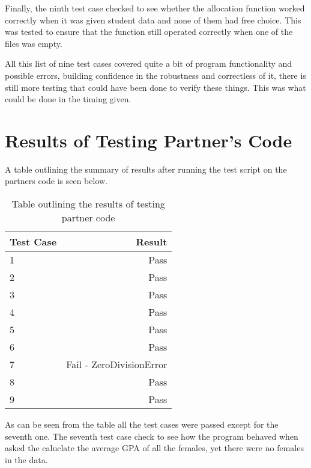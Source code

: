 \documentclass[12pt]{article}
\begin{document}
Finally, the ninth test case checked to see whether the allocation function worked 
correctly when it was given student data and none of them had free choice. This was
tested to ensure that the function still operated correctly when one of the files
was empty.

All this list of nine test cases covered quite a bit of program functionality and
possible errors, building confidence in the robustness and correctless of it, 
there is still more testing that could have been done to verify these things. This
was what could be done in the timing given.



\section{Results of Testing Partner's Code}

A table outlining the summary of results after running the test script on the
partners code is seen below.

\begin{table}[h]
	\centering
	\begin{tabular}{lr}
		\toprule
		Test Case & Result\\
		\midrule
		1 & Pass\\
		2 & Pass\\
		3 & Pass\\
		4 & Pass\\
		5 & Pass\\
		6 & Pass\\
		7 & Fail - ZeroDivisionError\\
		8 & Pass\\
		9 & Pass\\
		\bottomrule
	\end{tabular}
	\caption{Table outlining the results of testing partner code}
	\label{Table:1}
\end{table}

As can be seen from the table all the test cases were passed except for the 
seventh one. The seventh test case check to see how the program behaved when
asked the caluclate the average GPA of all the females, yet there were no females
in the data.
\end{document}
